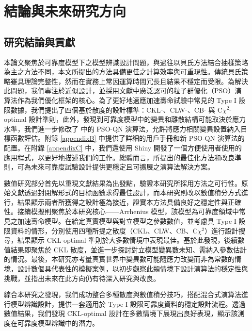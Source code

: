 \chapter{結論與未來研究方向\label{CH: conclusion}}

\section{研究結論與貢獻}

\hspace*{8mm} 本論文聚焦於可靠度模型下之模型辨識設計問題，與過往以貝氏方法結合抽樣策略為主之方法不同，本文所提出的方法具備更佳之計算效率與可重現性。傳統貝氏策略雖具理論完整性，然而在實務上常因運算時間冗長且結果不穩定而受限。為解決此問題，我們專注於近似設計，並採用文獻中廣泛認可的粒子群優化（PSO）演算法作為我們優化框架的核心。為了更好地適應加速壽命試驗中常見的 Type I 設限數據，我們提出了四個基於散度的設計標準：CKL-、CLW-、CB- 與 C$\chi^2$-optimal 設計準則，此外，發現到可靠度模型中的變異和離散結構可能取決於應力水準，我們進一步修改了 \cite{chen2020hybrid} 中的 PSO-QN 演算法，允許將應力相關變異設置納入目標函數評估。附錄 \ref{appendixB} 中提供了詳細的用戶手冊和新 PSO-QN 演算法的配置。在附錄 \ref{appendixC} 中，我們還使用 Shiny 開發了一個方便使用者使用的應用程式，以更好地描述我們的工作。總體而言，所提出的最佳化方法和改良準則，可為未來可靠度試驗設計提供更穩定且可擴展之演算法解決方案。

\hspace*{8mm} 數值研究部分首先以重現文獻結果為出發點，驗證本研究所採用方法之可行性。原始文獻透過封閉解形式的目標函數求得最佳設計，而本研究則改以數值積分方式進行，結果顯示兩者所獲得之設計極為接近，證實本方法具備良好之穩定性與正確性。接續模擬則聚焦於本研究核心——Arrhenius 模型，該模型為可靠度領域中常見之加速壽命模型。在給定真實模型與對立模型之參數數值，並考慮具 Type I 設限資料的情形，分別使用四種所提之散度（CKL、CLW、CB、C$\chi^2$）進行設計搜尋，結果顯示 CKL-optimal 準則於大多數情境中表現最佳。基於此發現，後續數值結果即聚焦於 CKL 散度，並進一步探討對立模型變異數未知、需納入參數估計的情況。最後，本研究亦考量真實世界中變異數可能隨應力改變而非為常數的情境，設計數個具代表性的模擬案例，以初步觀察此類情境下設計演算法的穩定性與挑戰，並指出未來在此方向仍有待深入研究與改良。

\hspace*{8mm} 綜合本研究之發現，我們成功整合多種散度與數值積分技巧，搭配混合式演算法進行模型辨識設計，提供一套適用於 Type I 設限可靠度資料的穩定設計流程。透過數值結果，我們發現 CKL-optimal 設計在多數情境下展現出良好表現，顯示該測度在可靠度模型辨識中的潛力。

